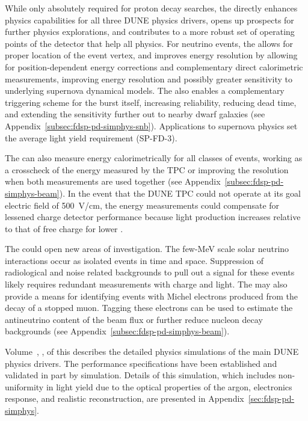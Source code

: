 While only absolutely required for proton decay searches, the  directly enhances physics capabilities for all three DUNE physics drivers, opens up prospects for further physics explorations, and contributes to a more robust set of operating points of the detector that help all physics.   For  neutrino events, the  allows for proper location of the event vertex, and improves energy resolution by allowing for position-dependent energy corrections and complementary direct calorimetric measurements, 
improving energy resolution and possibly greater sensitivity to underlying supernova dynamical models.  The  also enables a complementary triggering scheme for the burst itself, increasing 
reliability, reducing dead time, and extending the sensitivity further out to nearby dwarf galaxies (see Appendix~\ref{subsec:fdsp-pd-simphys-snb}). Applications to supernova physics set the average light yield requirement (SP-FD-3).


The  can also measure energy calorimetrically for all classes of events, working as a crosscheck of the energy measured by the TPC or improving the resolution when both measurements are used together (see Appendix~\ref{subsec:fdsp-pd-simphys-beam}).  In the event that the DUNE TPC could not operate at its goal electric field of \SI{500}{V/cm}, the  energy measurements could compensate for lessened charge detector performance because light production increases relative to that of free charge for lower \efield{}.

The  could open new areas of investigation.  The few-MeV scale solar neutrino interactions occur as isolated events in time and space.  Suppression of radiological and noise related backgrounds to pull out a signal for these events likely requires  redundant measurements with charge and light.  The  may also provide a means for identifying events with Michel electrons produced from the decay of a stopped muon. Tagging these electrons can be used to estimate the antineutrino content of the beam flux or further reduce nucleon decay backgrounds (see Appendix~\ref{subsec:fdsp-pd-simphys-beam}).
 

Volume~\volnumberphysics{}, \voltitlephysics{},  of this  describes the detailed physics simulations of the main DUNE physics drivers.  
The  performance specifications have been established and validated in part by simulation.  Details of this simulation, which includes non-uniformity in light yield due to the optical properties of the argon, electronics response, and realistic reconstruction, are presented in Appendix~\ref{sec:fdsp-pd-simphys}.


